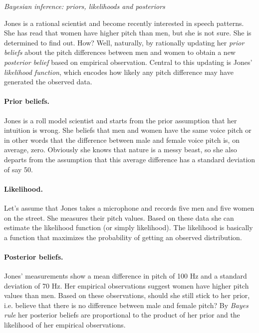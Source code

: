 \documentclass[nobib]{tufte-handout}
\begin{document}
\begin{InfoBox}[]
\centering
\colorbox{mygray}{\centering
  \begin{minipage}{1.0\textwidth}

    \emph{Bayesian inference: priors, likelihoods and posteriors}
    \medskip

    Jones is a rational scientist and become recently interested in speech patterns. She has read that women have higher pitch than men, but she is not
    sure. She is determined to find out. How? Well, naturally, by rationally updating her
    \emph{prior beliefs} about the pitch differences between men and women to obtain a new \emph{posterior belief} based on
    empirical observation. Central to this updating is Jones'
    \emph{likelihood function}, which encodes how likely any pitch difference may have generated the observed data.
    
    \paragraph{Prior beliefs.} Jones is a roll model scientist and starts from the prior assumption that her intuition is wrong. She beliefs that men and women have the same voice pitch or in other words that the difference between male and female voice pitch is, on average, zero. Obviously she knows that nature is a messy beast, so she also departs from the assumption that this average difference has a standard deviation of say 50.

    \paragraph{Likelihood.} Let's assume that Jones takes a microphone and records five  men and five women on the street. She measures their pitch values. Based on these data she can estimate the likelihood function (or simply likelihood). The likelihood is basically a function that maximizes the probability of getting an observed distribution.

    \paragraph{Posterior beliefs.} Jones' measurements show a mean difference in pitch of 100 Hz and a standard deviation of 70 Hz. Her empirical observations suggest women have higher pitch values than men. Based on these observations, should she
still stick to her prior, i.e. believe that there is no difference between male and female pitch? By \emph{Bayes rule} her posterior beliefs are proportional to the product of her prior and the likelihood of her empirical observations.


\end{minipage}}
\end{InfoBox}
\end{document}
